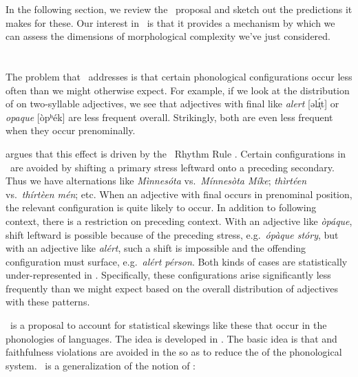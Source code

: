 \documentclass[output=paper,
modfonts
]{LSP/langsci}
\begin{document}
\noindent In the following section, we review the \io\ proposal and sketch out the predictions it makes for these. Our interest in \io\ is that it provides a mechanism by which we can assess the dimensions of morphological complexity we've just considered.

\section{\io}
\label{sec:io}

The problem that \io\ addresses is that certain phonological configurations occur less often than we might otherwise expect. For example, if we look at the distribution of  on two-syllable adjectives, we see that adjectives with final  like \emph{alert} [əlɹ̩́t] or \emph{opaque} [òpʰék] are less frequent overall. Strikingly, both are even less frequent when they occur prenominally.

\citet{inopt} argues that this effect is driven by the \e\ Rhythm Rule \citep{lp,hayesrhythm}. Certain configurations in \e\ are avoided by shifting a primary stress leftward onto a preceding secondary. Thus we have alternations like \emph{Mìnnesóta} vs.\ \emph{Mínnesòta Míke}; \emph{thìrtéen} vs.\ \emph{thírtèen mén}; etc. When an adjective with final  occurs in prenominal position, the relevant configuration is quite likely to occur. In addition to following context, there is a restriction on preceding context. With an adjective like \emph{òpáque},  shift leftward is possible because of the preceding stress, e.g.\ \emph{ópàque stóry}, but with an adjective like \emph{alért}, such a shift is impossible and the offending configuration must surface, e.g.\ \emph{alért pérson}. Both kinds of cases are statistically under-represented in \e. Specifically, these configurations arise significantly less frequently than we might expect based on the overall distribution of adjectives with these  patterns.

\io\ is a proposal to account for statistical skewings like these that occur in the phonologies of languages. The idea is developed in \citet{inopt,hammond.complexity,inopt.phon}. The basic idea is that  and faithfulness violations are avoided in the  so as to reduce the  of the phonological system. \io\ is a generalization of the notion of  \cite{ps}:
\end{document}
